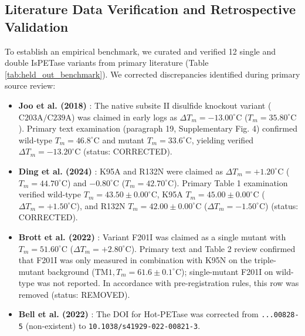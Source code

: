 \documentclass[11pt,a4paper]{article}
\begin{document}
\subsection{Literature Data Verification and Retrospective Validation}
To establish an empirical benchmark, we curated and verified 12 single and double IsPETase variants from primary literature (Table \ref{tab:held_out_benchmark}). We corrected discrepancies identified during primary source review:
\begin{itemize}
    \item \textbf{Joo et al. (2018)} \cite{joo2018structural}: The native subsite II disulfide knockout variant ($\text{C203A/C239A}$) was claimed in early logs as $\Delta T_m = -13.00^\circ\text{C}$ ($T_m = 35.80^\circ\text{C}$). Primary text examination (paragraph 19, Supplementary Fig. 4) confirmed wild-type $T_m = 46.8^\circ\text{C}$ and mutant $T_m = 33.6^\circ\text{C}$, yielding verified $\Delta T_m = -13.20^\circ\text{C}$ (status: CORRECTED).
    \item \textbf{Ding et al. (2024)} \cite{ding2024modulation}: K95A and R132N were claimed as $\Delta T_m = +1.20^\circ\text{C}$ ($T_m = 44.70^\circ\text{C}$) and $-0.80^\circ\text{C}$ ($T_m = 42.70^\circ\text{C}$). Primary Table 1 examination verified wild-type $T_m = 43.50 \pm 0.00^\circ\text{C}$, K95A $T_m = 45.00 \pm 0.00^\circ\text{C}$ ($\Delta T_m = +1.50^\circ\text{C}$), and R132N $T_m = 42.00 \pm 0.00^\circ\text{C}$ ($\Delta T_m = -1.50^\circ\text{C}$) (status: CORRECTED).
    \item \textbf{Brott et al. (2022)} \cite{brott2022engineering}: Variant F201I was claimed as a single mutant with $T_m = 51.60^\circ\text{C}$ ($\Delta T_m = +2.80^\circ\text{C}$). Primary text and Table 2 review confirmed that F201I was only measured in combination with K95N on the triple-mutant background ($\text{TM1}, T_m = 61.6 \pm 0.1^\circ\text{C}$); single-mutant F201I on wild-type was not reported. In accordance with pre-registration rules, this row was removed (status: REMOVED).
    \item \textbf{Bell et al. (2022)} \cite{bell2022directed}: The DOI for Hot-PETase was corrected from \texttt{...00828-5} (non-existent) to \texttt{10.1038/s41929-022-00821-3}.
\end{itemize}
\end{document}

